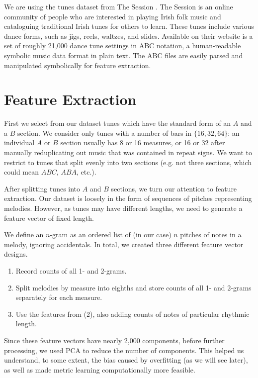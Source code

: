 \documentclass{article} %
\begin{document}
We are using the tunes dataset from The Session \cite{thesession}. The
Session is an online community of people who are interested in playing Irish
folk music and cataloguing traditional Irish tunes for others to learn. These
tunes include various dance forms, such as jigs, reels, waltzes, and slides.
Available on their website is a set of roughly 21,000 dance tune settings
in ABC notation, a human-readable symbolic music data format in plain text. The
ABC files are easily parsed and manipulated symbolically for feature extraction.

\section{Feature Extraction}

First we select from our dataset tunes which have the standard form of an $A$
and a $B$ section. We consider only tunes with a number of bars in $\{16, 32,
64\}$: an individual $A$ or $B$ section usually has 8 or 16 measures, or 16 or
32 after manually reduplicating out music that was contained in repeat signs. We
want to restrict to tunes that split evenly into two sections (e.g.  not three
sections, which could mean $ABC$, $ABA$, etc.).

After splitting tunes into $A$ and $B$ sections, we turn our attention to
feature extraction.  Our dataset is loosely in the form of sequences of pitches
representing melodies. However, as tunes may have different lengths, we need to
generate a feature vector of fixed length.

We define an $n$-gram as an ordered list of (in our case) $n$ pitches of notes
in a melody, ignoring accidentals. In total, we created three different feature
vector designs.
\begin{enumerate}
\item Record counts of all 1- and 2-grams.

\item Split melodies by measure into eighths and store counts of all 1- and
2-grams separately for each measure.

\item Use the features from (2), also adding counts of notes of particular
  rhythmic length.
\end{enumerate}

Since these feature vectors have nearly 2,000 components, before further
processing, we used PCA to reduce the number of components. This helped us
understand, to some extent, the bias caused by overfitting (as we will see
later), as well as made metric learning computationally more feasible.
\end{document}
